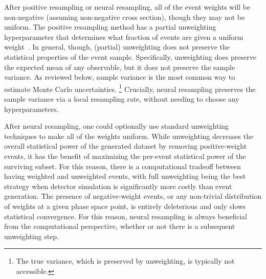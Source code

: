 \documentclass[prd,twocolumn,superscriptaddress,longbibliography,preprintnumbers,floatfix,nofootinbib]{revtex4-1}
\begin{document}
After positive resampling or neural resampling, all of the event weights will be non-negative (assuming non-negative cross section), though they may not be uniform.
%
The positive resampling method has a partial unweighting hyperparameter that determines what fraction of events are given a uniform weight~\cite{andersen2020positive}.
%
In general, though, (partial) unweighting does not preserve the statistical properties of the event sample.
%
Specifically, unweighting does preserve the expected mean of any observable, but it does not preserve the sample variance.
%
As reviewed below, sample variance is the most common way to estimate Monte Carlo uncertainties.%
%
\footnote{The true variance, which is preserved by unweighting, is typically not accessible.}
%
Crucially, neural resampling preserves the sample variance via a local resampling rate, without needing to choose any hyperparameters.


After neural resampling, one could optionally use standard unweighting techniques to make all of the weights uniform.  While unweighting decreases the overall statistical power of the generated dataset by removing positive-weight events, it has the benefit of maximizing the per-event statistical power of the surviving subset.  For this reason, there is a computational tradeoff between having weighted and unweighted events, with full unweighting being the best strategy when detector simulation is significantly more costly than event generation.  The presence of negative-weight events, or any non-trivial distribution of weights at a given phase space point, is entirely deleterious and only slows statistical convergence.  For this reason, neural resampling is always beneficial from the computational perspective, whether or not there is a subsequent unweighting step.
\end{document}
